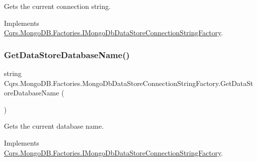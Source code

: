 Gets the current connection string. 



Implements \hyperlink{interfaceCqrs_1_1MongoDB_1_1Factories_1_1IMongoDbDataStoreConnectionStringFactory_a31cb87fb2cf1435912f635394494ed91_a31cb87fb2cf1435912f635394494ed91}{Cqrs.\+Mongo\+D\+B.\+Factories.\+I\+Mongo\+Db\+Data\+Store\+Connection\+String\+Factory}.

\mbox{\label{classCqrs_1_1MongoDB_1_1Factories_1_1MongoDbDataStoreConnectionStringFactory_ab8729212ac8fe8350dead56fc89a5fd2_ab8729212ac8fe8350dead56fc89a5fd2}} 
\subsubsection{\texorpdfstring{Get\+Data\+Store\+Database\+Name()}{GetDataStoreDatabaseName()}}
{\footnotesize\ttfamily string Cqrs.\+Mongo\+D\+B.\+Factories.\+Mongo\+Db\+Data\+Store\+Connection\+String\+Factory.\+Get\+Data\+Store\+Database\+Name (\begin{DoxyParamCaption}{ }\end{DoxyParamCaption})}



Gets the current database name. 



Implements \hyperlink{interfaceCqrs_1_1MongoDB_1_1Factories_1_1IMongoDbDataStoreConnectionStringFactory_aca9921fae4214a9eb22a221825c57363_aca9921fae4214a9eb22a221825c57363}{Cqrs.\+Mongo\+D\+B.\+Factories.\+I\+Mongo\+Db\+Data\+Store\+Connection\+String\+Factory}.



